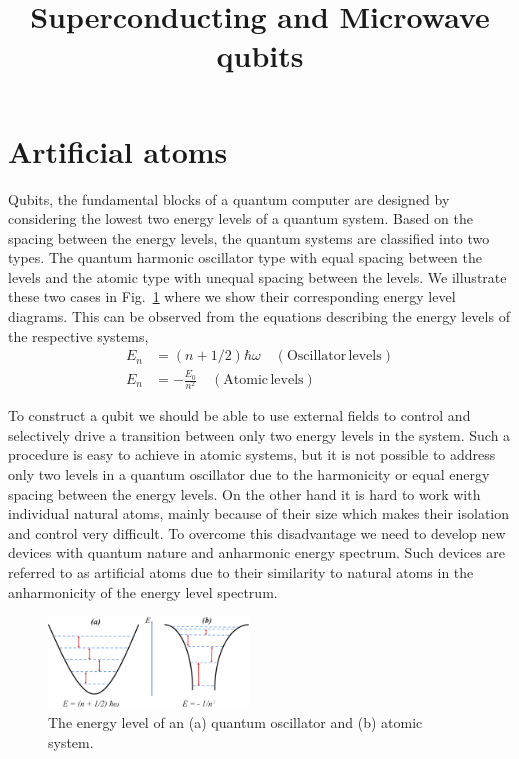 \documentclass[twocolumn, aps, rmp, amsmath, amssymb, nofootinbib, superscriptaddress, longbibliography, floatfix, table-of-contents, eqsecnum]{revtex4-1}
\begin{document}
\title{Superconducting and Microwave qubits}
\maketitle

\section{Artificial atoms}

Qubits, the fundamental blocks of a quantum computer are designed by considering the lowest two energy levels of a quantum system. Based on the spacing between the energy levels, the quantum systems are classified into two types. The quantum harmonic oscillator type with equal spacing between the levels and the atomic type with unequal spacing between the levels. We illustrate these two cases in Fig.~\ref{fig:artificial_atom_energy_levels} where we show their corresponding energy level diagrams. This can be observed from the equations describing the energy levels of the respective systems,
\begin{align}
E_{n} &= (n+1/2) \hbar \omega \quad (\mathrm{Oscillator\,levels}) \nonumber \\ 
E_{n} &= -\frac{E_{0}}{n^{2}} \quad (\mathrm{Atomic\,levels})
\end{align}

To construct a qubit we should be able to use external fields to control and selectively drive a transition between only two energy levels in the system. Such a procedure is easy to achieve in atomic systems, but it is not possible to address only two levels in a quantum oscillator due to the harmonicity or equal energy spacing between the energy levels. On the other hand it is hard to work with individual natural atoms, mainly because of their size which makes their isolation and control very difficult. To overcome this disadvantage we need to develop new devices with quantum nature and anharmonic energy spectrum. Such devices are referred to as artificial atoms due to their similarity to natural atoms in the anharmonicity of the energy level spectrum.

\begin{figure}[!htbp]
\includegraphics[width=0.475\textwidth]{artificial_atom_energy_levels}
\caption{The energy level of an (a) quantum oscillator and (b) atomic system.}\label{fig:artificial_atom_energy_levels}
\end{figure}
\end{document}
